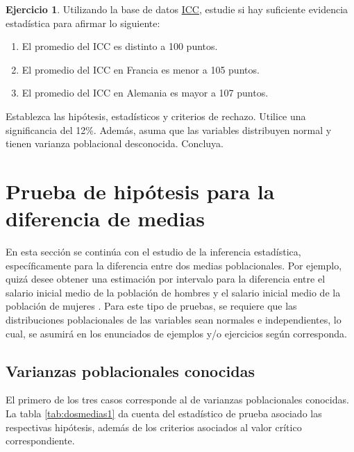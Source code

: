 \documentclass[
  11pt,
]{book}
\providecommand{\tightlist}{%
  \setlength{\itemsep}{0pt}\setlength{\parskip}{0pt}}
\theoremstyle{definition}
\theoremstyle{definition}
\theoremstyle{definition}
\newtheorem{exercise}{Ejercicio}[chapter]
\theoremstyle{definition}
\theoremstyle{remark}
\begin{document}
\begin{exercise}
\protect\hypertarget{exr:consumidor}{}\label{exr:consumidor}Utilizando la base de datos \hyperref[ICC]{ICC}, estudie si hay suficiente evidencia estadística para afirmar lo siguiente:

\begin{enumerate}
\def\labelenumi{\arabic{enumi}.}
\tightlist
\item
  El promedio del ICC es distinto a 100 puntos.
\item
  El promedio del ICC en Francia es menor a 105 puntos.
\item
  El promedio del ICC en Alemania es mayor a 107 puntos.
\end{enumerate}

Establezca las hipótesis, estadísticos y criterios de rechazo. Utilice una significancia del 12\%. Además, asuma que las variables distribuyen normal y tienen varianza poblacional desconocida. Concluya.
\end{exercise}

\section{Prueba de hipótesis para la diferencia de medias}\label{prueba-de-hipotesis-diferencia-de-medias}

En esta sección se continúa con el estudio de la inferencia estadística, específicamente para la diferencia entre dos medias poblacionales. Por ejemplo, quizá desee obtener una estimación por intervalo para la diferencia entre el salario inicial medio de la población de hombres y el salario inicial medio de la población de mujeres \citep[página 395]{anderson}. Para este tipo de pruebas, se requiere que las distribuciones poblacionales de las variables sean normales e independientes, lo cual, se asumirá en los enunciados de ejemplos y/o ejercicios según corresponda.

\subsection{Varianzas poblacionales conocidas}\label{prueba-de-hipotesis-diferencia-de-medias-varianzas-conocidas}

El primero de los tres casos corresponde al de varianzas poblacionales conocidas. La tabla \ref{tab:dosmedias1} da cuenta del estadístico de prueba asociado las respectivas hipótesis, además de los criterios asociados al valor crítico correspondiente.
\end{document}
